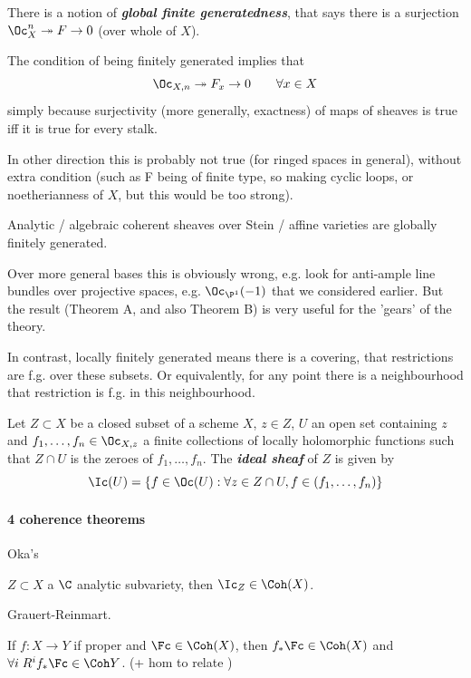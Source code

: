 \begin{defn}
	There is a notion of \textbf{\textit{global finite generatedness}}, that says there is a surjection $\Oc_X^n \twoheadrightarrow F \to 0$ (over whole of $X$).
\end{defn}
\begin{remark}
	The condition of being finitely generated implies that
	\[\Oc_{X,n}\twoheadrightarrow F_x\to 0\qquad\forall x\in X\]
	simply because surjectivity (more generally, exactness) of maps of sheaves is true iff it is true for every stalk.
	
	In other direction this is probably not true (for ringed spaces in general), without extra condition (such as F being of finite type, so making cyclic loops, or noetherianness of $X$, but this would be too strong).
\end{remark}
\begin{thm}
	Analytic / algebraic coherent sheaves over Stein / affine varieties are globally finitely generated.
\end{thm}

Over more general bases this is obviously wrong, e.g. look for anti-ample line bundles over projective spaces, e.g. $\Oc_{\P^1}(-1)$ that we considered earlier. But the result (Theorem A, and also Theorem B) is very useful for the 'gears' of the theory.

In contrast, locally finitely generated means there is a covering, that restrictions are f.g. over these subsets. Or equivalently, for any point there is a neighbourhood that restriction is f.g. in this neighbourhood.

\begin{defn}
	Let $Z\subset X$ be a closed subset of a scheme $X$, $z\in Z$, $U$ an open set containing $z$ and $f_1,\ldots,f_n\in\Oc_{X,z}$ a finite collections of locally holomorphic functions such that $Z\cap U$ is the zeroes of $f_1,\ldots,f_n$. The \textbf{\textit{ideal sheaf}} of $Z$ is given by
	\[\Ic(U)=\{f\in\Oc(U):\forall z\in Z\cap U, f\in(f_1,\ldots,f_n)\}\]
\end{defn}
\paragraph{4 coherence theorems}
\begin{thm}
	Oka's
\end{thm}
\begin{thm}
	$Z\subset X$ a $\C$ analytic subvariety, then $\Ic_Z\in \Coh(X)$.
\end{thm}
\begin{thm}
	Grauert-Reinmart.
\end{thm}
\begin{thm}
	If $f:X\to Y$ if proper and $\Fc\in\Coh(X)$, then $f_*\Fc\in\Coh(X)$ and $\forall i \;R^i f_*\Fc\in\Coh Y$. (+ hom to relate )
\end{thm}

